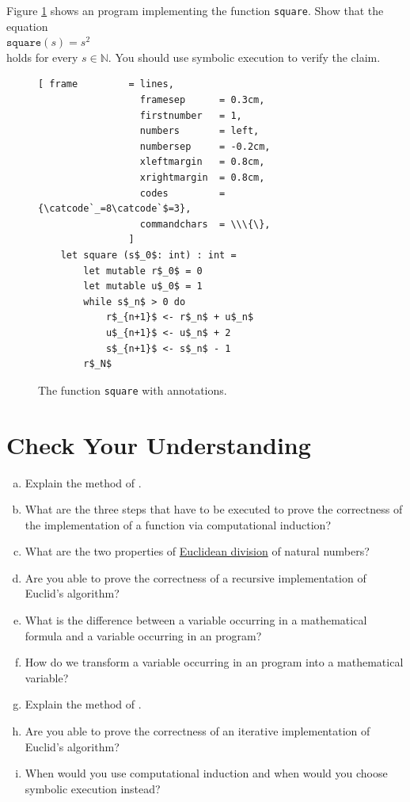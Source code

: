 \exerciseEng
Figure \ref{fig:square-iterative} shows an \Fsharp{} program implementing the function \texttt{square}.  Show that the equation
\\[0.2cm]
\hspace*{1.3cm}
$\mathtt{square}(s) = s^2$
\\[0.2cm]
holds for every $s \in \mathbb{N}$.  You should use symbolic execution to verify the claim.
\eox

\begin{figure}[!ht]
\centering
\begin{Verbatim}[ frame         = lines, 
                  framesep      = 0.3cm, 
                  firstnumber   = 1,
                  numbers       = left,
                  numbersep     = -0.2cm,
                  xleftmargin   = 0.8cm,
                  xrightmargin  = 0.8cm,
                  codes         = {\catcode`_=8\catcode`$=3},
                  commandchars  = \\\{\},
                ]
    let square (s$_0$: int) : int =
        let mutable r$_0$ = 0
        let mutable u$_0$ = 1
        while s$_n$ > 0 do
            r$_{n+1}$ <- r$_n$ + u$_n$
            u$_{n+1}$ <- u$_n$ + 2
            s$_{n+1}$ <- s$_n$ - 1
        r$_N$
\end{Verbatim}
\vspace*{-0.3cm}
\caption{The function \texttt{square} with annotations.}
\label{fig:square-iterative}
\end{figure}

\pagebreak

\section{Check Your Understanding}
\begin{enumerate}[(a)]
\item Explain the method of .  
\item What are the three steps that have to be executed to prove the correctness of the implementation of a
      \Fsharp{} function via computational induction?
\item What are the two properties of \href{https://en.wikipedia.org/wiki/Euclidean_division}{Euclidean division} of natural numbers?
\item Are you able to prove the correctness of a recursive implementation of Euclid's algorithm?
\item What is the difference between a variable occurring in a mathematical formula and a variable occurring in
      an \Fsharp{} program?
\item How do we transform a variable occurring in an \Fsharp{} program into a mathematical variable?
\item Explain the method of .
\item Are you able to prove the correctness of an iterative implementation of Euclid's algorithm?
\item When would you use computational induction and when would you choose symbolic execution instead?
\end{enumerate}


